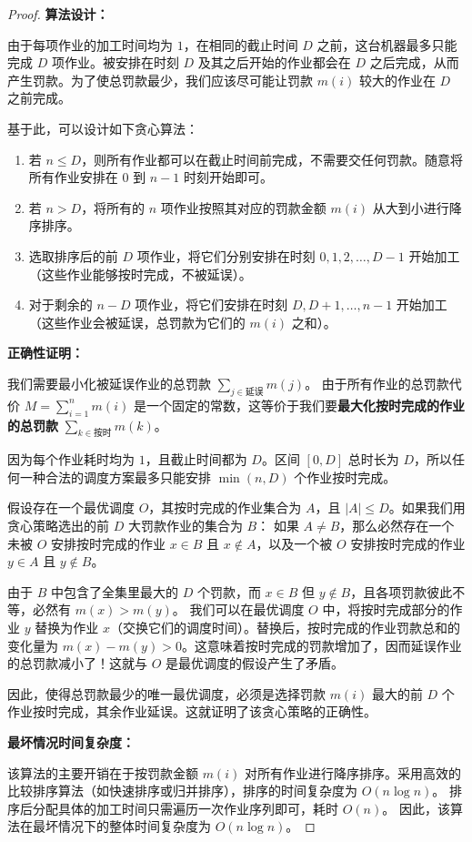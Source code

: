 \documentclass[11pt, a4paper]{article}
\begin{document}
\begin{proof}
    \textbf{算法设计：}
    
    由于每项作业的加工时间均为 $1$，在相同的截止时间 $D$ 之前，这台机器最多只能完成 $D$ 项作业。被安排在时刻 $D$ 及其之后开始的作业都会在 $D$ 之后完成，从而产生罚款。为了使总罚款最少，我们应该尽可能让罚款 $m(i)$ 较大的作业在 $D$ 之前完成。
    
    基于此，可以设计如下贪心算法：
    \begin{enumerate}
        \item 若 $n \le D$，则所有作业都可以在截止时间前完成，不需要交任何罚款。随意将所有作业安排在 $0$ 到 $n-1$ 时刻开始即可。
        \item 若 $n > D$，将所有的 $n$ 项作业按照其对应的罚款金额 $m(i)$ 从大到小进行降序排序。
        \item 选取排序后的前 $D$ 项作业，将它们分别安排在时刻 $0, 1, 2, \dots, D-1$ 开始加工（这些作业能够按时完成，不被延误）。
        \item 对于剩余的 $n-D$ 项作业，将它们安排在时刻 $D, D+1, \dots, n-1$ 开始加工（这些作业会被延误，总罚款为它们的 $m(i)$ 之和）。
    \end{enumerate}

    \textbf{正确性证明：}
    
    我们需要最小化被延误作业的总罚款 $\sum_{j \in \text{延误}} m(j)$。
    由于所有作业的总罚款代价 $M = \sum_{i=1}^n m(i)$ 是一个固定的常数，这等价于我们要\textbf{最大化按时完成的作业的总罚款} $\sum_{k \in \text{按时}} m(k)$。
    
    因为每个作业耗时均为 $1$，且截止时间都为 $D$。区间 $[0, D]$ 总时长为 $D$，所以任何一种合法的调度方案最多只能安排 $\min(n, D)$ 个作业按时完成。
    
    假设存在一个最优调度 $O$，其按时完成的作业集合为 $A$，且 $|A| \le D$。如果我们用贪心策略选出的前 $D$ 大罚款作业的集合为 $B$：
    如果 $A \neq B$，那么必然存在一个未被 $O$ 安排按时完成的作业 $x \in B$ 且 $x \notin A$，以及一个被 $O$ 安排按时完成的作业 $y \in A$ 且 $y \notin B$。
    
    由于 $B$ 中包含了全集里最大的 $D$ 个罚款，而 $x \in B$ 但 $y \notin B$，且各项罚款彼此不等，必然有 $m(x) > m(y)$。
    我们可以在最优调度 $O$ 中，将按时完成部分的作业 $y$ 替换为作业 $x$（交换它们的调度时间）。替换后，按时完成的作业罚款总和的变化量为 $m(x) - m(y) > 0$。这意味着按时完成的罚款增加了，因而延误作业的总罚款减小了！这就与 $O$ 是最优调度的假设产生了矛盾。
    
    因此，使得总罚款最少的唯一最优调度，必须是选择罚款 $m(i)$ 最大的前 $D$ 个作业按时完成，其余作业延误。这就证明了该贪心策略的正确性。

    \textbf{最坏情况时间复杂度：}
    
    该算法的主要开销在于按罚款金额 $m(i)$ 对所有作业进行降序排序。采用高效的比较排序算法（如快速排序或归并排序），排序的时间复杂度为 $O(n \log n)$。
    排序后分配具体的加工时间只需遍历一次作业序列即可，耗时 $O(n)$。
    因此，该算法在最坏情况下的整体时间复杂度为 $O(n \log n)$。
\end{proof}
\end{document}
